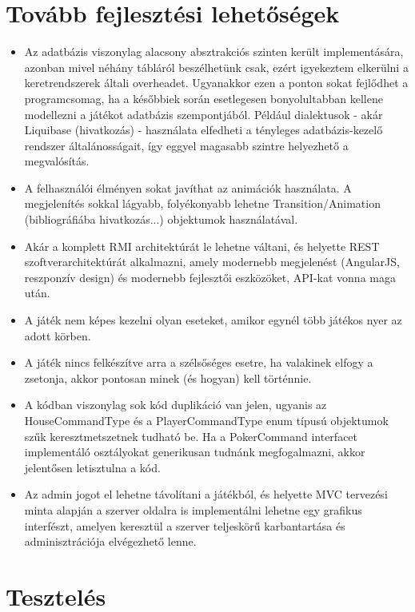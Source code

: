 \section{Tovább fejlesztési lehetőségek}
\begin{itemize}
\item Az adatbázis viszonylag alacsony absztrakciós szinten került implementására, azonban mivel néhány tábláról beszélhetünk csak, ezért igyekeztem elkerülni a keretrendszerek általi overheadet. Ugyanakkor ezen a ponton sokat fejlődhet a programcsomag, ha a későbbiek során esetlegesen bonyolultabban kellene modellezni a játékot adatbázis szempontjából. Például dialektusok - akár Liquibase (hivatkozás) - használata elfedheti a tényleges adatbázis-kezelő rendszer általánosságait, így eggyel magasabb szintre helyezhető a megvalósítás.
\item A felhasználói élményen sokat javíthat az animációk használata. A megjelenítés sokkal lágyabb, folyékonyabb lehetne Transition/Animation (bibliográfiába hivatkozás...) objektumok használatával.
\item Akár a komplett RMI architektúrát le lehetne váltani, és helyette REST szoftverarchitektúrát alkalmazni, amely modernebb megjelenést (AngularJS, reszponzív design) és modernebb fejlesztői eszközöket, API-kat vonna maga után.
\item A játék nem képes kezelni olyan eseteket, amikor egynél több játékos nyer az adott körben.
\item A játék nincs felkészítve arra a szélsőséges esetre, ha valakinek elfogy a zsetonja, akkor pontosan minek (és hogyan) kell történnie.
\item A kódban viszonylag sok kód duplikáció van jelen, ugyanis az HouseCommandType és a PlayerCommandType enum típusú objektumok szűk keresztmetszetnek tudható be. Ha a PokerCommand interfacet implementáló osztályokat generikusan tudnánk megfogalmazni, akkor jelentősen letisztulna a kód.
\item Az admin jogot el lehetne távolítani a játékból, és helyette MVC tervezési minta alapján a szerver oldalra is implementálni lehetne egy grafikus interfészt, amelyen keresztül a szerver teljeskörű karbantartása és adminisztrációja elvégezhető lenne.
\end{itemize}

\section{Tesztelés}
